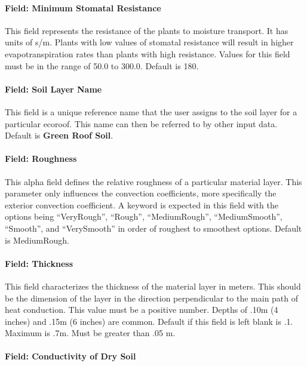 \paragraph{Field: Minimum Stomatal Resistance}\label{field-minimum-stomatal-resistance}

This field represents the resistance of the plants to moisture transport. It has units of s/m. Plants with low values of stomatal resistance will result in higher evapotranspiration rates than plants with high resistance. Values for this field must be in the range of 50.0 to 300.0. Default is 180.

\paragraph{Field: Soil Layer Name}\label{field-soil-layer-name}

This field is a unique reference name that the user assigns to the soil layer for a particular ecoroof. This name can then be referred to by other input data. Default is \textbf{Green Roof Soil}.

\paragraph{Field: Roughness}\label{field-roughness-2}

This alpha field defines the relative roughness of a particular material layer. This parameter only influences the convection coefficients, more specifically the exterior convection coefficient. A keyword is expected in this field with the options being ``VeryRough'', ``Rough'', ``MediumRough'', ``MediumSmooth'', ``Smooth'', and ``VerySmooth'' in order of roughest to smoothest options. Default is MediumRough.

\paragraph{Field: Thickness}\label{field-thickness-9}

This field characterizes the thickness of the material layer in meters. This should be the dimension of the layer in the direction perpendicular to the main path of heat conduction. This value must be a positive number. Depths of .10m (4 inches) and .15m (6 inches) are common. Default if this field is left blank is .1. Maximum is .7m. Must be greater than .05 m.

\paragraph{Field: Conductivity of Dry Soil}\label{field-conductivity-of-dry-soil}


